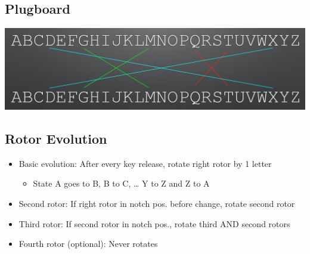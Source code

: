        	\subsection{Plugboard}
       		\begin{center}
         		\includegraphics[width=180mm]{Graphics/Historical Ciphers/Enigma6.png}\newline
       		\end{center}
       	
       	\subsection{Rotor Evolution}
       		\begin{itemize}
       			\item Basic evolution: After every key release, rotate right rotor by 1 letter
       				\begin{itemize}
       					\item State A goes to B, B to C, … Y to Z and Z to A
       				\end{itemize}
       			\item Second rotor: If right rotor in notch pos. before change, rotate second rotor
       			\item Third rotor: If second rotor in notch pos., rotate third AND second rotors
       			\item Fourth rotor (optional): Never rotates
       		\end{itemize}
       	
